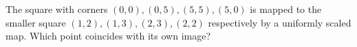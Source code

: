 The square with corners $(0,0),(0,5),(5,5),(5,0)$ is mapped to the smaller square $(1,2),(1,3),(2,3),(2,2)$ respectively by a uniformly scaled map. Which point coincides with its own image?
